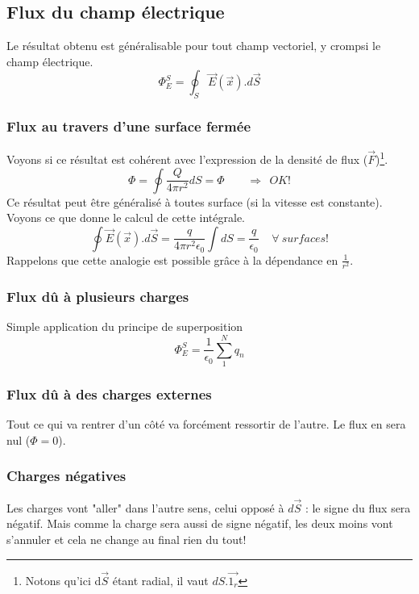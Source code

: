 \documentclass	[11pt, a4paper, openany]{book}
\begin{document}
\subsection{Flux du champ électrique}
Le résultat obtenu est généralisable pour tout champ vectoriel, y crompsi le champ électrique.
\begin{equation}
\Phi^S_E = \oint_S \vec{E}(\vec{x}).d\vec S
\end{equation}

\subsubsection{Flux au travers d'une surface fermée}
Voyons si ce résultat est cohérent avec l'expression de la densité de flux ($\vec F$)\footnote{Notons qu'ici d$\vec{S}$ étant radial, il vaut $dS.\vec{1_r}$}.\\
\begin{equation}
\Phi = \oint \frac{Q}{4\pi r^2} dS = \Phi\ \ \ \ \ \ \ \ \ \Rightarrow \ \ OK !
\end{equation}
Ce résultat peut être généralisé à toutes surface (si la vitesse est constante).\\
Voyons ce que donne le calcul de cette intégrale. 
\begin{equation}
\oint \vec{E}(\vec x).d\vec{S} = \frac{q}{4\pi r^2 \epsilon_0}\int dS = \frac{q}{\epsilon_0}\ \ \ \ \ \forall\ surfaces !
\end{equation}
Rappelons que cette analogie est possible grâce à la dépendance en $\frac{1}{r^2}$.

\subsubsection{Flux dû à plusieurs charges}
Simple application du principe de superposition
\begin{equation}
\Phi^S_E = \frac{1}{\epsilon_0}\sum_1^N q_n
\end{equation}

\subsubsection{Flux dû à des charges externes}
Tout ce qui va rentrer d'un côté va forcément ressortir de l'autre. Le flux en sera nul ($\Phi = 0$).


\subsubsection{Charges négatives}
Les charges vont "aller" dans l'autre sens, celui opposé à $d\vec S$ : le signe du flux sera négatif. Mais comme la charge sera aussi de signe négatif, les deux moins vont s'annuler et cela ne change au final rien du tout!
\end{document}
